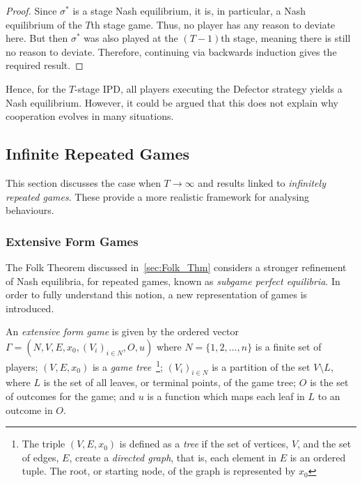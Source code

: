 \begin{proof}
    Since \( \sigma^{*} \) is a stage Nash equilibrium, it is, in particular,
    a Nash equilibrium of the \(T\)th stage game. Thus, no player has any reason
    to deviate here. But then \( \sigma^{*} \) was also played at the
    \((T-1)\)th stage, meaning there is still no reason to deviate.
    Therefore, continuing via backwards induction gives the required result.
\end{proof}

Hence, for the \(T\)-stage IPD, all players executing the Defector strategy
yields a Nash equilibrium. However, it could be argued that this does not
explain why cooperation evolves in many situations.

\subsection{Infinite Repeated Games}\label{subsec:Infinite_Repeated_Games}
This section discusses the case when \(T \to \infty \) and results linked to
\textit{infinitely repeated games}. These provide a more realistic framework for
analysing behaviours. 

\subsubsection{Extensive Form Games}\label{subsubsec:Extensive_Form_Games}
The Folk Theorem discussed in~\autoref{sec:Folk_Thm}
considers a stronger refinement of Nash equilibria, for repeated games, known as
\textit{subgame perfect equilibria}. In order to fully understand this notion, a
new representation of games is introduced.

\begin{definition}
   An \textit{extensive form game} is given by the ordered vector
\(\Gamma = (N, V, E, x_{0}, {(V_{i})}_{i \in N}, O, u)\)
where \(N=\{1, 2, \ldots, n\} \) is a finite set of players; \((V, E, x_{0})\)
is a \textit{game tree}~\footnote{The triple \((V, E, x_{0})\) is defined as a
\textit{tree} if the set of vertices, \(V\), and the set of edges, \(E\), create
a \textit{directed graph}, that is, each element in \(E\) is an ordered tuple.
The root, or starting node, of the graph is represented by \(x_{0}\)};
\({(V_{i})}_{i \in N}\) is a partition of the set \(V \setminus L\), where \(L\)
is the set of all
leaves, or terminal points, of the game tree; \(O\) is the set of outcomes for
the game; and \(u\) is a function which maps each leaf in \(L\) to an outcome 
in \(O\). 
\end{definition}

